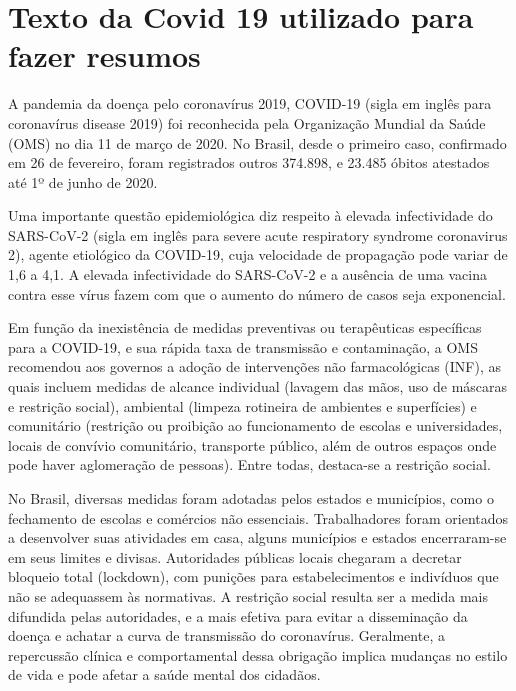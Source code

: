 \label{an:forms}

\section{Texto da Covid 19 utilizado para fazer resumos}
\label{chap:texto_covid}
A pandemia da doença pelo coronavírus 2019, COVID-19 (sigla em inglês para coronavírus disease 2019) foi reconhecida pela Organização Mundial da Saúde (OMS) no dia 11 de março de 2020. No Brasil, desde o primeiro caso, confirmado em 26 de fevereiro, foram registrados outros 374.898, e 23.485 óbitos atestados até 1º de junho de 2020.

Uma importante questão epidemiológica diz respeito à elevada infectividade do SARS-CoV-2 (sigla em inglês para severe acute respiratory syndrome coronavirus 2), agente etiológico da COVID-19, cuja velocidade de propagação pode variar de 1,6 a 4,1. A elevada infectividade do SARS-CoV-2 e a ausência de uma vacina contra esse vírus fazem com que o aumento do número de casos seja exponencial.

Em função da inexistência de medidas preventivas ou terapêuticas específicas para a COVID-19, e sua rápida taxa de transmissão e contaminação, a OMS recomendou aos governos a adoção de intervenções não farmacológicas (INF), as quais incluem medidas de alcance individual (lavagem das mãos, uso de máscaras e restrição social), ambiental (limpeza rotineira de ambientes e superfícies) e comunitário (restrição ou proibição ao funcionamento de escolas e universidades, locais de convívio comunitário, transporte público,
além de outros espaços onde pode haver aglomeração de pessoas). Entre todas, destaca-se a restrição social.

No Brasil, diversas medidas foram adotadas pelos estados e municípios, como o fechamento de escolas e comércios não essenciais. Trabalhadores foram orientados a desenvolver suas atividades em casa, alguns municípios e estados encerraram-se em seus limites e divisas. Autoridades públicas locais chegaram a decretar bloqueio total (lockdown), com punições para estabelecimentos e indivíduos que não se adequassem às normativas. A restrição social resulta ser a medida mais difundida pelas autoridades, e a mais efetiva para evitar a disseminação da doença e achatar a curva de transmissão do coronavírus. Geralmente, a repercussão clínica e comportamental dessa obrigação implica mudanças no estilo de vida e pode afetar a saúde mental dos cidadãos.

